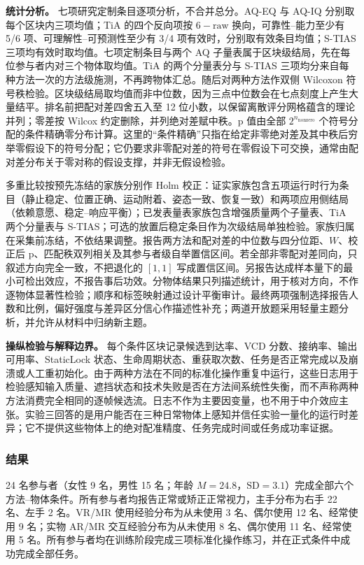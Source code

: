 \documentclass[review]{vgtc}
\begin{document}
\textbf{统计分析。} 七项研究定制条目逐项分析，不合并总分。AQ-EQ 与 AQ-IQ 分别取每个区块内三项均值；TiA 的四个反向项按 $6-\mathrm{raw}$ 换向，可靠性--能力至少有 5/6 项、可理解性--可预测性至少有 3/4 项有效时，分别取有效条目均值；S-TIAS 三项均有效时取均值。七项定制条目与两个 AQ 子量表属于区块级结局，先在每位参与者内对三个物体取均值。TiA 的两个分量表分与 S-TIAS 三项均分来自每种方法一次的方法级施测，不再跨物体汇总。随后对两种方法作双侧 Wilcoxon 符号秩检验。区块级结局取均值而非中位数，因为三点中位数会在七点刻度上产生大量结平。排名前把配对差四舍五入至 12 位小数，以保留离散评分网格蕴含的理论并列；零差按 Wilcox 约定删除，并列绝对差赋中秩。p 值由全部 $2^{n_{\mathrm{nonzero}}}$ 个符号分配的条件精确零分布计算。这里的“条件精确”只指在给定非零绝对差及其中秩后穷举零假设下的符号分配；它仍要求非零配对差的符号在零假设下可交换，通常由配对差分布关于零对称的假设支撑，并非无假设检验。

多重比较按预先冻结的家族分别作 Holm 校正：证实家族包含五项运行时行为条目（静止稳定、位置正确、运动附着、姿态一致、恢复一致）和两项应用侧结局（依赖意愿、稳定--响应平衡）；已发表量表家族包含增强质量两个子量表、TiA 两个分量表与 S-TIAS；可选的放置后稳定条目作为次级结局单独检验。家族归属在采集前冻结，不依结果调整。报告两方法和配对差的中位数与四分位距、$W$、校正后 p、匹配秩双列相关及其参与者级自举置信区间。若全部非零配对差同向，只叙述方向完全一致，不把退化的 $[1,1]$ 写成置信区间。另报告达成样本量下的最小可检出效应，不报告事后功效。分物体结果只列描述统计，用于核对方向，不作逐物体显著性检验；顺序和标签映射通过设计平衡审计。最终两项强制选择报告人数和比例，偏好强度与差异区分信心作描述性补充；两道开放题采用轻量主题分析，并允许从材料中归纳新主题。

\textbf{操纵检验与解释边界。} 每个条件区块记录候选到达率、VCD 分数、接纳率、输出可用率、StaticLock 状态、生命周期状态、重获取次数、任务是否正常完成以及崩溃或人工重初始化。由于两种方法在不同的标准化操作重复中运行，这些日志用于检验感知输入质量、遮挡状态和技术失败是否在方法间系统性失衡，而不声称两种方法消费完全相同的逐帧候选流。日志不作为主要因变量，也不用于中介效应主张。实验三回答的是用户能否在三种日常物体上感知并信任实验一量化的运行时差异；它不提供这些物体上的绝对配准精度、任务完成时间或任务成功率证据。

\subsubsection{结果}

24 名参与者（女性 9 名，男性 15 名；年龄 $M=24.8$，$\mathrm{SD}=3.1$）完成全部六个方法--物体条件。所有参与者均报告正常或矫正正常视力，主手分布为右手 22 名、左手 2 名。VR/MR 使用经验分布为从未使用 3 名、偶尔使用 12 名、经常使用 9 名；实物 AR/MR 交互经验分布为从未使用 8 名、偶尔使用 11 名、经常使用 5 名。所有参与者均在训练阶段完成三项标准化操作练习，并在正式条件中成功完成全部任务。
\end{document}
